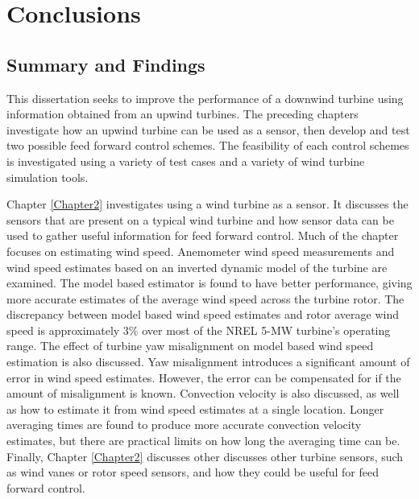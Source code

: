 
\chapter{Conclusions} %

\label{Chapter7} %


\section{Summary and Findings}

This dissertation seeks to improve the performance of a downwind turbine using information obtained from an upwind turbines. The preceding chapters investigate how an upwind turbine can be used as a sensor, then develop and test two possible feed forward control schemes. The feasibility of each control schemes is investigated using a variety of test cases and a variety of wind turbine simulation tools.

Chapter \ref{Chapter2} investigates using a wind turbine as a sensor. It discusses the sensors that are present on a typical wind turbine and how sensor data can be used to gather useful information for feed forward control. Much of the chapter focuses on estimating wind speed. Anemometer wind speed measurements and wind speed estimates based on an inverted dynamic model of the turbine are examined. The model based estimator is found to have better performance, giving more accurate estimates of the average wind speed across the turbine rotor. The discrepancy between model based wind speed estimates and rotor average wind speed is approximately 3\% over most of the NREL 5-MW turbine's operating range. The effect of turbine yaw misalignment on model based wind speed estimation is also discussed. Yaw misalignment introduces a significant amount of error in wind speed estimates. However, the error can be compensated for if the amount of misalignment is known. Convection velocity is also discussed, as well as how to estimate it from wind speed estimates at a single location. Longer averaging times are found to produce more accurate convection velocity estimates, but there are practical limits on how long the averaging time can be. Finally, Chapter \ref{Chapter2} discusses other discusses other turbine sensors, such as wind vanes or rotor speed sensors, and how they could be useful for feed forward control.

